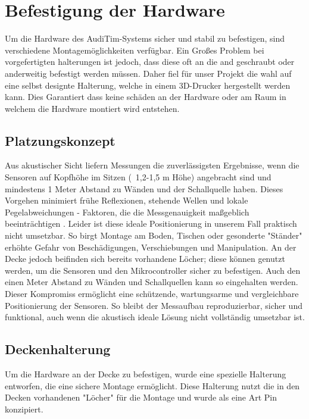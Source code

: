 \chapter{Befestigung der Hardware}
\label{chap:Befestigung_der_Hardware}
Um die Hardware des AudiTim-Systems sicher und stabil zu befestigen, sind verschiedene Montagemöglichkeiten verfügbar. 
Ein Großes Problem bei vorgefertigten halterungen ist jedoch, dass diese oft an die and geschraubt oder anderweitig befestigt werden müssen.
Daher fiel für unser Projekt die wahl auf eine selbst designte Halterung, welche in einem 3D-Drucker hergestellt werden kann.
Dies Garantiert dass keine schäden an der Hardware oder am Raum in welchem die Hardware montiert wird entstehen.

\section{Platzungskonzept}
Aus akustischer Sicht liefern Messungen die zuverlässigsten Ergebnisse, wenn die Sensoren auf Kopfhöhe im Sitzen (~1,2-1,5 m Höhe) angebracht sind und mindestens 1 Meter Abstand zu Wänden und der Schallquelle haben. 
Dieses Vorgehen minimiert frühe Reflexionen, stehende Wellen und lokale Pegelabweichungen - Faktoren, die die Messgenauigkeit maßgeblich beeinträchtigen \cite{oltheten2019micplacement} .
Leider ist diese ideale Positionierung in unserem Fall praktisch nicht umsetzbar. So birgt Montage am Boden, Tischen oder gesonderte "Ständer" erhöhte Gefahr von Beschädigungen, Verschiebungen und Manipulation.
An der Decke jedoch beifinden sich bereits vorhandene Löcher; diese können genutzt werden, um die Sensoren und den Mikrocontroller sicher zu befestigen. 
Auch den einen Meter Abstand zu Wänden und Schallquellen kann so eingehalten werden.
Dieser Kompromiss ermöglicht eine schützende, wartungsarme und vergleichbare Positionierung der Sensoren.
So bleibt der Messaufbau reproduzierbar, sicher und funktional, auch wenn die akustisch ideale Lösung nicht vollständig umsetzbar ist.

\section{Deckenhalterung}
Um die Hardware an der Decke zu befestigen, wurde eine spezielle Halterung entworfen, die eine sichere Montage ermöglicht.
Diese Halterung nutzt die in den Decken vorhandenen "Löcher" für die Montage und wurde als eine Art Pin konzipiert.

\begin{center}
  \begin{minipage}[b]{0.32\textwidth}
  \end{minipage}
  \hfill
  \begin{minipage}[b]{0.32\textwidth}
  \end{minipage}
  \hfill
  \begin{minipage}[b]{0.32\textwidth}
  \end{minipage}
\end{center}

